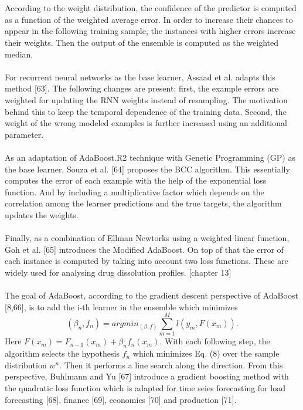 \documentclass[runningheads,a4paper]{llncs}[2015/06/24]
\begin{document}
\hspace{1cm}\\\\According to the weight distribution, the confidence of the predictor is computed as a function of the weighted average error. In order to increase their chances to appear in the following training sample, the instances with higher errors increase their weights. Then the output of the ensemble is computed as the weighted median. \\\\ For recurrent neural networks as the base learner, Assaad et al. adapts this method [63]. The following changes are present: first, the example errors are weighted for updating the RNN weights instead of resampling. The motivation behind this to keep the temporal dependence of the training data. Second, the weight of the wrong modeled examples is further increased using an additional parameter. \\\\ As an adaptation of AdaBoost.R2 technique with Genetic Programming (GP) as the base learner, Souza et al. [64] proposes the BCC algorithm. This essentially computes the error of each example with the help of the exponential loss function.  And by including a multiplicative factor which depends on the correlation among the learner predictions and the true targets, the algorithm updates the weights. \\\\ Finally, as a combination of Ellman Newtorks using a weighted linear function, Goh et al. [65] introduces the Modified AdaBoost. On top of that the error of each instance is computed by taking into account two loss functions. These are widely used for analysing drug dissolution profiles. [chapter 13] \\\\ The goal of AdaBoost, according to the gradient descent perspective of AdaBoost [8,66], is to add the i-th learner in the ensemble which minimizes
\begin{equation}
(β_n, f_n)=argmin_{(β,f)} \sum_{m=1}^{M} l(y_m, F(x_m)).
\end{equation}
Here $F(x_m)=F_{n-1}(x_m)+ β_n f_n (x_m)$. With each following step, the algorithm selects the hypothesis $f_n$ which minimizes Eq. (8) over the sample distribution $w^n$. Then it performs a line search along the direction. From this perspective, Buhlmann and Yu [67] introduce a gradient boosting method with the quadratic loss function which is adapted for time seies forecasting for load forecasting [68], finance [69], economics [70] and production [71].
\end{document}

